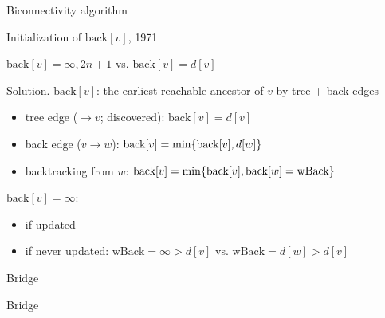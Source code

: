 \begin{frame}{Biconnectivity algorithm}
  \begin{exampleblock}{Initialization of $\text{back}[v]$, 1971 }
    \begin{center}
      $\text{back}[v] = \infty, 2n+1$ vs. $\text{back}[v] = d[v]$
    \end{center}
  \end{exampleblock}

  \begin{block}{Solution.}
    $\text{back}[v]$: the earliest reachable ancestor of $v$ by tree + back edges
    \begin{itemize}
      \item tree edge ($\to v$; discovered): $\text{back}[v] = d[v]$
      \item back edge ($v \to w$): $\text{back}[v] = \min \{\text{back}[v], d[w]\}$
      \item backtracking from $w$: $\text{back}[v] = \min \{\text{back}[v], \text{back}[w] = \text{wBack}\}$
    \end{itemize}

    $\text{back}[v] = \infty$:
    \begin{itemize}
      \item if updated
      \item if never updated: $\text{wBack} = \infty > d[v]$ vs. $\text{wBack} = d[w] > d[v]$
    \end{itemize}
  \end{block}
\end{frame}
\begin{frame}{Bridge}
  \begin{exampleblock}{Bridge }
    
  \end{exampleblock}
\end{frame}
